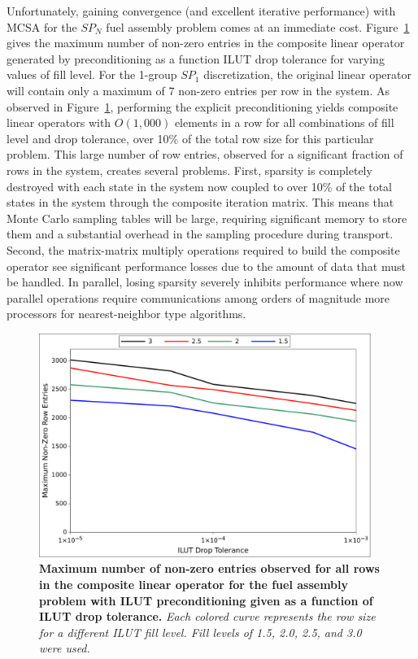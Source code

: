 Unfortunately, gaining convergence (and excellent iterative
performance) with MCSA for the $SP_N$ fuel assembly problem comes at
an immediate cost. Figure~\ref{fig:ilut_size} gives the maximum number
of non-zero entries in the composite linear operator generated by
preconditioning as a function ILUT drop tolerance for varying values
of fill level. For the 1-group $SP_1$ discretization, the original
linear operator will contain only a maximum of 7 non-zero entries per
row in the system. As observed in Figure~\ref{fig:ilut_size},
performing the explicit preconditioning yields composite linear
operators with $O(1,000)$ elements in a row for all combinations of
fill level and drop tolerance, over 10\% of the total row size for
this particular problem. This large number of row entries, observed
for a significant fraction of rows in the system, creates several
problems. First, sparsity is completely destroyed with each state in
the system now coupled to over 10\% of the total states in the system
through the composite iteration matrix. This means that Monte Carlo
sampling tables will be large, requiring significant memory to store
them and a substantial overhead in the sampling procedure during
transport. Second, the matrix-matrix multiply operations required to
build the composite operator see significant performance losses due to
the amount of data that must be handled. In parallel, losing sparsity
severely inhibits performance where now parallel operations require
communications among orders of magnitude more processors for
nearest-neighbor type algorithms.
\begin{figure}[t!]
  \begin{center}
    \includegraphics[width=4.25in]{chapters/spn_equations/ilut_size.pdf}
  \end{center}
  \caption{\textbf{Maximum number of non-zero entries observed for all
      rows in the composite linear operator for the fuel assembly
      problem with ILUT preconditioning given as a function of ILUT
      drop tolerance.} \textit{Each colored curve represents the row
      size for a different ILUT fill level. Fill levels of 1.5, 2.0,
      2.5, and 3.0 were used.}}
  \label{fig:ilut_size}
\end{figure}

